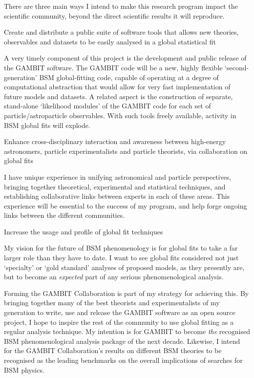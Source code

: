 \documentclass[a4paper,11pt]{article}
\begin{document}
There are three main ways I intend to make this research program impact the scientific community, beyond the direct scientific results it will reproduce.

\begin{enumerate}
\setlength{\itemsep}{2pt}
\setcounter{enumi}{3}

{\it \item Create and distribute a public suite of software tools that allows new theories, observables and datasets to be easily analysed in a global statistical fit}

A very timely component of this project is the development and public release of the GAMBIT software.  The GAMBIT code will be a new, highly flexible `second-generation' BSM global-fitting code, capable of operating at a degree of computational abstraction that would allow for very fast implementation of future models and datasets.  A related aspect is the construction of separate, stand-alone `likelihood modules' of the GAMBIT code for each set of particle/astroparticle observables. With such tools freely available, activity in BSM global fits will explode.

{\it \item Enhance cross-disciplinary interaction and awareness between high-energy astronomers, particle experimentalists and particle theorists, via collaboration on global fits}

I have unique experience in unifying astronomical and particle perspectives, bringing together theoretical, experimental and statistical techniques, and establishing collaborative links between experts in each of these areas. This experience will be essential to the success of my program, and help forge ongoing links between the different communities.

{\it \item Increase the usage and profile of global fit techniques}

My vision for the future of BSM phenomenology is for global fits to take a far larger role than they have to date.  I want to see global fits considered not just `specialty' or `gold standard' analyses of proposed models, as they presently are, but to become an \textit{expected} part of any serious phenomenological analysis.  

Forming the GAMBIT Collaboration is part of my strategy for achieving this.  By bringing together many of the best theorists and experimentalists of my generation to write, use and release the GAMBIT software as an open source project, I hope to inspire the rest of the community to use global fitting as a regular analysis technique.  My intention is for GAMBIT to become \textit{the} recognised BSM phenomenological analysis package of the next decade.  Likewise, I intend for the GAMBIT Collaboration's results on different BSM theories to be recognised as the leading benchmarks on the overall implications of searches for BSM physics.

\end{enumerate}
\end{document}
